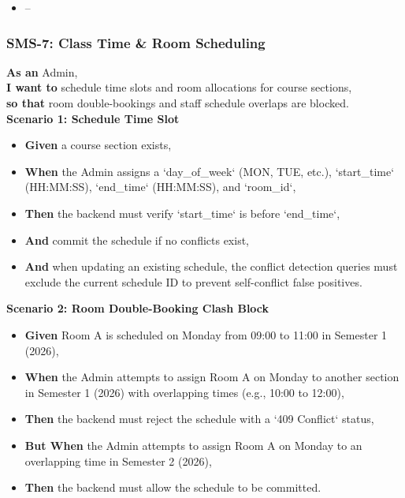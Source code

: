 \begin{itemize}
  \item --
\end{itemize}

\subsubsection{SMS-7: Class Time \& Room Scheduling}
\noindent \textbf{As an} Admin, \\
\noindent \textbf{I want to} schedule time slots and room allocations for course sections, \\
\noindent \textbf{so that} room double-bookings and staff schedule overlaps are blocked. \\



\noindent\textbf{Scenario 1: Schedule Time Slot}\\
\begin{itemize}
  \item \textbf{Given} a course section exists,
  \item \textbf{When} the Admin assigns a `day\_of\_week` (MON, TUE, etc.), `start\_time` (HH:MM:SS), `end\_time` (HH:MM:SS), and `room\_id`,
  \item \textbf{Then} the backend must verify `start\_time` is before `end\_time`,
  \item \textbf{And} commit the schedule if no conflicts exist,
  \item \textbf{And} when updating an existing schedule, the conflict detection queries must exclude the current schedule ID to prevent self-conflict false positives.
\end{itemize}


\noindent\textbf{Scenario 2: Room Double-Booking Clash Block}\\
\begin{itemize}
  \item \textbf{Given} Room A is scheduled on Monday from 09:00 to 11:00 in Semester 1 (2026),
  \item \textbf{When} the Admin attempts to assign Room A on Monday to another section in Semester 1 (2026) with overlapping times (e.g., 10:00 to 12:00),
  \item \textbf{Then} the backend must reject the schedule with a `409 Conflict` status,
  \item \textbf{But When} the Admin attempts to assign Room A on Monday to an overlapping time in Semester 2 (2026),
  \item \textbf{Then} the backend must allow the schedule to be committed.
\end{itemize}


